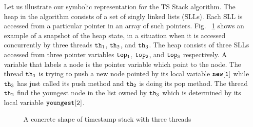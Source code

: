 Let us illustrate our symbolic representation for the TS Stack algorithm.
The heap in the algorithm consists of a set of singly linked lists (SLLs). Each
SLL is accessed from a particular pointer in an array of such pointers. 
Fig. ~\ref{fig:tsshape} shows an example of a snapshot of the heap state, in a situation when
it is accessed concurrently by three threads ${\tt th}_1$, ${\tt th}_2$, and ${\tt th}_3$. The heap consists of three SLLs accessed from three pointer variables $\tt top_1$, $\tt top_2$, and $\tt top_3$ respectively. A variable that labels a node is the pointer variable which point to the node.
The thread ${\tt th}_1$ is trying to push a new node pointed by its local variable $\tt new[1]$ while ${\tt th}_3$ has just called its push method and ${\tt th}_2$ is doing its pop method. The thread ${\tt th}_2$ find the youngest node in the list owned by ${\tt th}_3$ which is determined by its local variable $\tt youngest[2]$.
\begin{figure}
	
\caption{A concrete shape of timestamp stack with three threads}
\label{fig:tsshape}
\end{figure} 
%	

